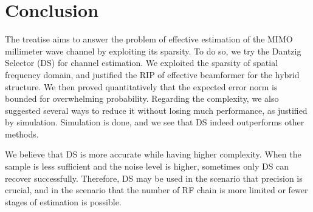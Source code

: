 
\chapter {Conclusion}

The treatise aims to answer the problem of effective estimation of the MIMO millimeter wave channel by exploiting its sparsity.
To do so, we try the Dantzig Selector (DS) for channel estimation.
We exploited the sparsity of spatial frequency domain, and justified the RIP of effective beamformer for the hybrid structure.
We then proved quantitatively that the expected error norm is bounded for overwhelming probability.
Regarding the complexity, we also suggested several ways to reduce it without losing much performance, as justified by simulation.
Simulation is done, and we see that DS indeed outperforms other methods.

We believe that DS is more accurate while having higher complexity.
When the sample is less sufficient and the noise level is higher, sometimes only DS can recover successfully.
Therefore, DS may be used in the scenario that precision is crucial, and in the scenario that the number of RF chain is more limited or fewer stages of estimation is possible.

